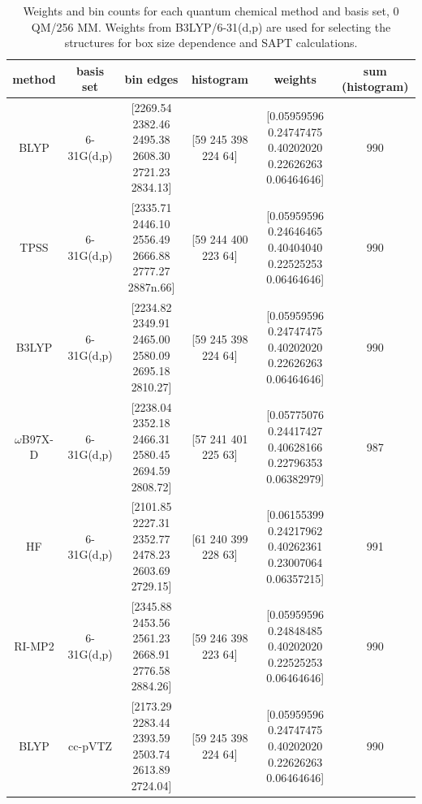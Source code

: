 \documentclass[%
  class = book,%
  crop = false,%
  float = true,%
  multi = true,%
  preview = false,%
]{standalone}
\begin{document}
\begin{landscape}
  \begin{table}
    \centering
    \caption[Histogram and weights of frequency distributions from MD snapshots]{Weights and bin counts for each quantum chemical method and basis set, 0 QM/256 MM. Weights from B3LYP/6-31(d,p) are used for selecting the structures for box size dependence and SAPT calculations.}
    \label{paper_02:tab:S2}
    \small
    \begin{tabular}{cccccc}
      \toprule
      method & basis set & bin edges & histogram & weights & sum (histogram) \\
      \midrule
      BLYP & 6-31G(d,p) & \makecell{[2269.54 2382.46 2495.38 \\ 2608.30 2721.23 2834.13]} & [59 245 398 224 64] & \makecell{[0.05959596 0.24747475 0.40202020 \\ 0.22626263 0.06464646]} & 990 \\
      TPSS & 6-31G(d,p) & \makecell{[2335.71 2446.10 2556.49 \\ 2666.88 2777.27 2887n.66]} & [59 244 400 223 64] & \makecell{[0.05959596 0.24646465 0.40404040 \\ 0.22525253 0.06464646]} & 990 \\
      B3LYP & 6-31G(d,p) & \makecell{[2234.82 2349.91 2465.00 \\ 2580.09 2695.18 2810.27]} & [59 245 398 224 64] & \makecell{[0.05959596 0.24747475 0.40202020 \\ 0.22626263 0.06464646]} & 990 \\
      \(\omega\)B97X-D & 6-31G(d,p) & \makecell{[2238.04 2352.18 2466.31 \\ 2580.45 2694.59 2808.72]} & [57 241 401 225 63] & \makecell{[0.05775076 0.24417427 0.40628166 \\ 0.22796353 0.06382979]} & 987 \\
      HF & 6-31G(d,p) & \makecell{[2101.85 2227.31 2352.77 \\ 2478.23 2603.69 2729.15]} & [61 240 399 228 63] & \makecell{[0.06155399 0.24217962 0.40262361 \\ 0.23007064 0.06357215]} & 991 \\
      RI-MP2 & 6-31G(d,p) & \makecell{[2345.88 2453.56 2561.23 \\ 2668.91 2776.58 2884.26]} & [59 246 398 223 64] & \makecell{[0.05959596 0.24848485 0.40202020 \\ 0.22525253 0.06464646]} & 990 \\
      BLYP & cc-pVTZ & \makecell{[2173.29 2283.44 2393.59 \\ 2503.74 2613.89 2724.04]} & [59 245 398 224 64] & \makecell{[0.05959596 0.24747475 0.40202020 \\ 0.22626263 0.06464646]} & 990 \\

\end{tabular}
\end{table}
\end{landscape}
\end{document}
